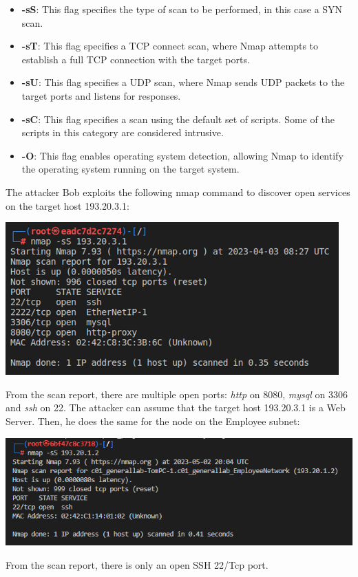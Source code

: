 \documentclass[a4paper, 12pt, oneside]{extbook}
\begin{document}
\begin{itemize}
  \item \textbf{-sS}: This flag specifies the type of scan to be performed, in this case a SYN scan.
  \item \textbf{-sT}: This flag specifies a TCP connect scan, where Nmap attempts to establish a full TCP connection with the target ports.
  \item \textbf{-sU}: This flag specifies a UDP scan, where Nmap sends UDP packets to the target ports and listens for responses.
  \item \textbf{-sC}: This flag specifies a scan using the default set of scripts. Some of the scripts in this category are considered intrusive.
  \item \textbf{-O}: This flag enables operating system detection, allowing Nmap to identify the operating system running on the target system.
\end{itemize}
The attacker Bob exploits the following nmap command to discover open services on the target host 193.20.3.1:
\begin{center}
  \includegraphics[scale=0.76]{../Image/scanning_company_ss.PNG}
\end{center}
From the scan report, there are multiple open ports: \textit{http} on 8080, \textit{mysql} on 3306 and \textit{ssh} on 22. The attacker can assume that the target host 193.20.3.1 is a Web Server.
\newline Then, he does the same for the node on the Employee subnet:
\begin{center}
  \includegraphics[scale=0.76]{../Image/scanning_employee_ss.PNG}
\end{center}
From the scan report, there is only an open SSH 22/Tcp port.
\end{document}
